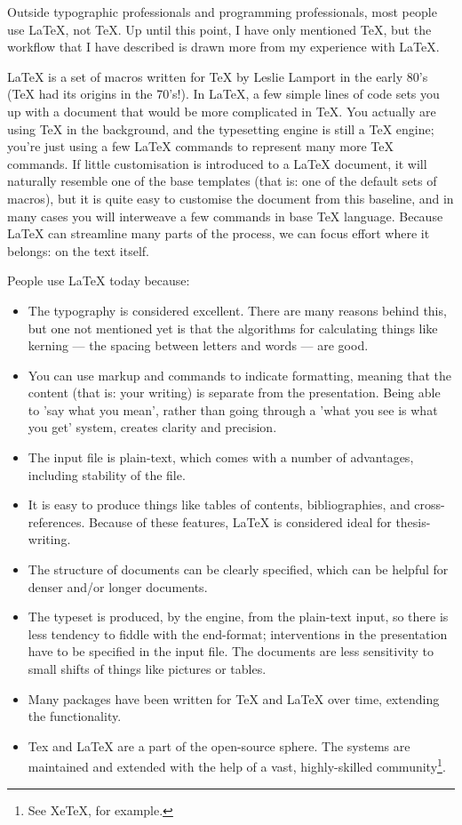 \documentclass[11pt, oneside]{memoir}
\begin{document}
Outside typographic professionals and programming professionals, most people use \LaTeX{}, not \TeX{}. Up until this point, I have only mentioned TeX, but the workflow that I have described is drawn more from my experience with LaTeX.

LaTeX is a set of macros written for TeX by Leslie Lamport in the early 80's (TeX had its origins in the 70's!). In LaTeX, a few simple lines of code sets you up with a document that would be more complicated in TeX. You actually are using TeX in the background, and the typesetting engine is still a TeX engine; you're just using a few LaTeX commands to represent many more TeX commands. If little customisation is introduced to a LaTeX document, it will naturally resemble one of the base templates (that is: one of the default sets of macros), but it is quite easy to customise the document from this baseline, and in many cases you will interweave a few commands in base TeX language. Because LaTeX can streamline many parts of the process, we can focus effort where it belongs: on the text itself.

People use LaTeX today because:
\begin{itemize}
    \item The typography is considered excellent. There are many reasons behind this, but one not mentioned yet is that the algorithms for calculating things like kerning — the spacing between letters and words — are good.
    \item You can use markup and commands to indicate formatting, meaning that the content (that is: your writing) is separate from the presentation. Being able to 'say what you mean', rather than going through a 'what you see is what you get' system, creates clarity and precision.
    \item The input file is plain-text, which comes with a number of advantages, including stability of the file. 
    \item It is easy to produce things like tables of contents, bibliographies, and cross-references. Because of these features, LaTeX is considered ideal for thesis-writing.
    \item The structure of documents can be clearly specified, which can be helpful for denser and/or longer documents.
    \item The typeset is produced, by the engine, from the plain-text input, so there is less tendency to fiddle with the end-format; interventions in the presentation have to be specified in the input file. The documents are less sensitivity to small shifts of things like pictures or tables.
    \item Many packages have been written for TeX and LaTeX over time, extending the functionality.
    \item Tex and LaTeX are a part of the open-source sphere. The systems are maintained and extended with the help of a vast, highly-skilled community\footnote{See XeTeX, for example.}.
\end{itemize}
\end{document}
